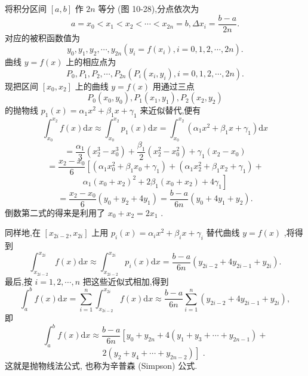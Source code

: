 将积分区间 \(\left\lbrack  {a,b}\right\rbrack\) 作 \({2n}\) 等分 (图 10-28),分点依次为
\[
a = {x}_{0} < {x}_{1} < {x}_{2} < \cdots  < {x}_{2n} = b,\Delta {x}_{i} = \frac{b - a}{2n}.
\]
对应的被积函数值为
\[
{y}_{0},{y}_{1},{y}_{2},\cdots ,{y}_{2n}\left( {{y}_{i} = f\left( {x}_{i}\right) ,i = 0,1,2,\cdots ,{2n}}\right) .
\]
曲线 \(y = f\left( x\right)\) 上的相应点为
\[
{P}_{0},{P}_{1},{P}_{2},\cdots ,{P}_{2n}\left( {{P}_{i}\left( {{x}_{i},{y}_{i}}\right) ,i = 0,1,2,\cdots ,{2n}}\right) .
\]
现把区间 \(\left\lbrack  {{x}_{0},{x}_{2}}\right\rbrack\) 上的曲线 \(y = f\left( x\right)\) 用通过三点
\[
{P}_{0}\left( {{x}_{0},{y}_{0}}\right) ,{P}_{1}\left( {{x}_{1},{y}_{1}}\right) ,{P}_{2}\left( {{x}_{2},{y}_{2}}\right)
\]
的抛物线 \({p}_{1}\left( x\right)  = {\alpha }_{1}{x}^{2} + {\beta }_{1}x + {\gamma }_{1}\) 来近似替代,便有
\[
{\int }_{{x}_{0}}^{{x}_{2}}f\left( x\right) \mathrm{d}x \approx  {\int }_{{x}_{0}}^{{x}_{2}}{p}_{1}\left( x\right) \mathrm{d}x = {\int }_{{x}_{0}}^{{x}_{2}}\left( {{\alpha }_{1}{x}^{2} + {\beta }_{1}x + {\gamma }_{1}}\right) \mathrm{d}x
\]
\[
= \frac{{\alpha }_{1}}{3}\left( {{x}_{2}^{3} - {x}_{0}^{3}}\right)  + \frac{{\beta }_{1}}{2}\left( {{x}_{2}^{2} - {x}_{0}^{2}}\right)  + {\gamma }_{1}\left( {{x}_{2} - {x}_{0}}\right)
\]
\[
= \frac{{x}_{2} - {x}_{0}}{6}\left\lbrack  {\left( {{\alpha }_{1}{x}_{0}^{2} + {\beta }_{1}{x}_{0} + {\gamma }_{1}}\right)  + \left( {{\alpha }_{1}{x}_{2}^{2} + {\beta }_{1}{x}_{2} + {\gamma }_{1}}\right)  + }\right.
\]
\[
\left. {{\alpha }_{1}{\left( {x}_{0} + {x}_{2}\right) }^{2} + 2{\beta }_{1}\left( {{x}_{0} + {x}_{2}}\right)  + 4{\gamma }_{1}}\right\rbrack
\]
\[
= \frac{{x}_{2} - {x}_{0}}{6}\left( {{y}_{0} + {y}_{2} + 4{y}_{1}}\right)  = \frac{b - a}{6n}\left( {{y}_{0} + 4{y}_{1} + {y}_{2}}\right) .
\]
倒数第二式的得来是利用了 \({x}_{0} + {x}_{2} = 2{x}_{1}\) .

同样地,在 \(\left\lbrack  {{x}_{{2i} - 2},{x}_{2i}}\right\rbrack\) 上用 \({p}_{i}\left( x\right)  = {\alpha }_{i}{x}^{2} + {\beta }_{i}x + {\gamma }_{i}\) 替代曲线 \(y = f\left( x\right)\) ,将得到
\[
{\int }_{{x}_{{2i} - 2}}^{{x}_{2i}}f\left( x\right) \mathrm{d}x \approx  {\int }_{{x}_{{2i} - 2}}^{{x}_{2i}}{p}_{i}\left( x\right) \mathrm{d}x = \frac{b - a}{6n}\left( {{y}_{{2i} - 2} + 4{y}_{{2i} - 1} + {y}_{2i}}\right) .
\]
最后,按 \(i = 1,2,\cdots ,n\) 把这些近似式相加,得到
\[
{\int }_{a}^{b}f\left( x\right) \mathrm{d}x = \mathop{\sum }\limits_{{i = 1}}^{n}{\int }_{{x}_{{2i} - 2}}^{{x}_{2i}}f\left( x\right) \mathrm{d}x \approx  \frac{b - a}{6n}\mathop{\sum }\limits_{{i = 1}}^{n}\left( {{y}_{{2i} - 2} + 4{y}_{{2i} - 1} + {y}_{2i}}\right) ,
\]
即
\[
{\int }_{a}^{b}f\left( x\right) \mathrm{d}x \approx  \frac{b - a}{6n}\left\lbrack  {{y}_{0} + {y}_{2n} + 4\left( {{y}_{1} + {y}_{3} + \cdots  + {y}_{{2n} - 1}}\right)  + }\right.
\]
\[
\left. {2\left( {{y}_{2} + {y}_{4} + \cdots  + {y}_{{2n} - 2}}\right) }\right\rbrack  \text{ . } \tag{3}
\]
这就是抛物线法公式, 也称为辛普森 (Simpson) 公式.

